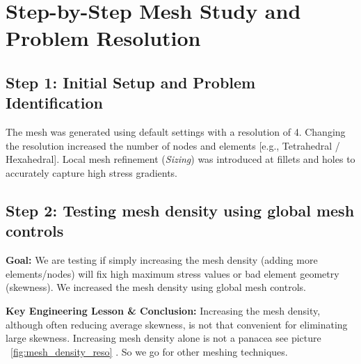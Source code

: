 \documentclass[12pt, a4paper]{article}
\begin{document}
	
	
	
	
	
	
	
	
	
	
	
	
	
	
	
	
	
	
	
	
	
	
	
	
	\section{Step-by-Step Mesh Study and Problem Resolution}
	
	\subsection{Step 1: Initial Setup and Problem Identification}
	The mesh was generated using default settings with a resolution of 4. Changing the resolution increased the number of nodes and elements [e.g., Tetrahedral / Hexahedral]. Local mesh refinement (\textit{Sizing}) was introduced at fillets and holes to accurately capture high stress gradients.
	
	
	\subsection{Step 2: Testing mesh density using global mesh controls}
	\textbf{Goal:} We are testing if simply increasing the mesh density (adding more elements/nodes) will fix high maximum stress values or bad element geometry (skewness). We increased the mesh density using global mesh controls.
	
	\textbf{Key Engineering Lesson \& Conclusion:} Increasing the mesh density, although often reducing average skewness, is not that convenient for eliminating large skewness. Increasing mesh density alone is not a panacea see picture ~\ref{fig:mesh_density_reso} . So we go for other meshing techniques.
	
	
\end{document}
